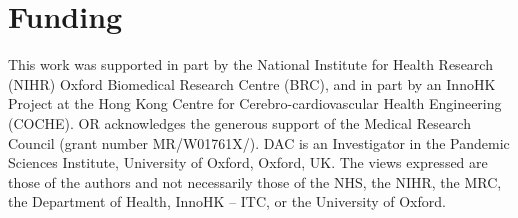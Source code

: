 \documentclass{article}
\begin{document}
\begin{table}[ht!]
    \centering
    \caption{\label{qa:continual} BioASQ QA test results for the models that were pre-trained on the PubMed dataset via MLM objective and continual learning. The metrics used for reporting the results are taken from the BioASQ competition and the models were assessed using the same evaluation script. The metrics are as follows: Strict Accuracy (S), Lenient Accuracy (L) and Mean Reciprocal Rank (M) scores.}
    \vspace{10pt}
    
\end{table}



\section*{Funding}

This work was supported in part by the National Institute for Health Research (NIHR) Oxford Biomedical Research Centre (BRC), and in part by an InnoHK Project at the Hong Kong Centre for Cerebro-cardiovascular Health Engineering (COCHE). OR acknowledges the generous support of the Medical Research Council (grant number MR/W01761X/). DAC is an Investigator in the Pandemic Sciences Institute, University of Oxford, Oxford, UK. The views expressed are those of the authors and not necessarily those of the NHS, the NIHR, the MRC, the Department of Health, InnoHK – ITC, or the University of Oxford.



\end{document}
